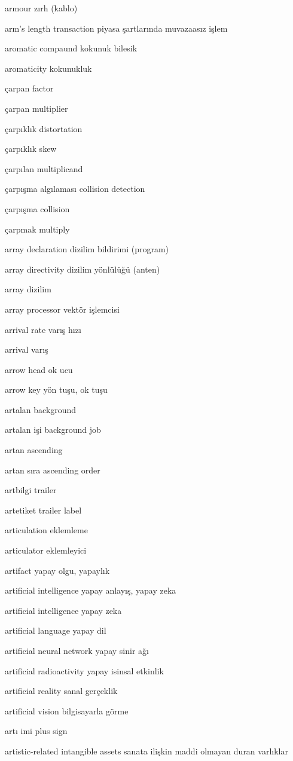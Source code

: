 \documentclass[12pt,fleqn]{article}\usepackage{../../common}
\begin{document}
armour zırh (kablo)

arm's length transaction piyasa şartlarında muvazaasız işlem

aromatic compaund kokunuk bilesik

aromaticity kokunukluk

çarpan factor

çarpan multiplier

çarpıklık distortation

çarpıklık skew

çarpılan multiplicand

çarpışma algılaması collision detection

çarpışma collision

çarpmak multiply

array declaration dizilim bildirimi (program)

array directivity dizilim yönlülüğü (anten)

array dizilim

array processor vektör işlemcisi

arrival rate varış hızı

arrival varış

arrow head ok ucu

arrow key yön tuşu, ok tuşu

artalan background

artalan işi background job

artan ascending

artan sıra ascending order

artbilgi trailer

artetiket trailer label

articulation eklemleme

articulator eklemleyici

artifact yapay olgu, yapaylık

artificial intelligence yapay anlayış, yapay zeka

artificial intelligence yapay zeka

artificial language yapay dil

artificial neural network yapay sinir ağı

artificial radioactivity yapay isinsal etkinlik

artificial reality sanal gerçeklik

artificial vision bilgisayarla görme

artı imi plus sign

artistic-related intangible assets sanata ilişkin maddi olmayan duran varlıklar
\end{document}

